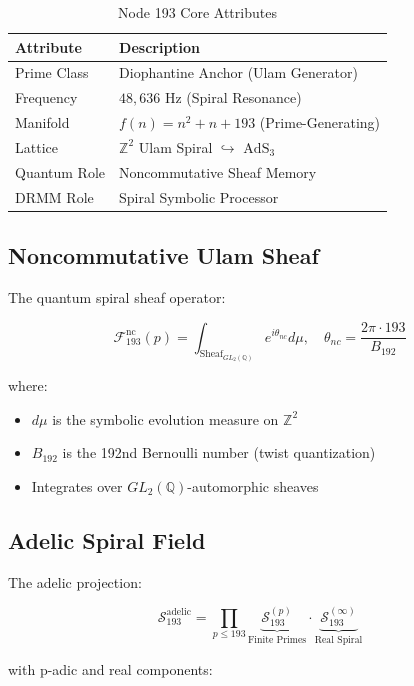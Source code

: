 \documentclass[12pt]{article}
\begin{document}
\begin{center}
\begin{table}[h]
\centering
\caption{Node 193 Core Attributes}
\begin{tabular}{ll}
\hline
\textbf{Attribute} & \textbf{Description} \\
\hline
Prime Class & Diophantine Anchor (Ulam Generator) \\
Frequency & $48,\!636$ Hz (Spiral Resonance) \\
Manifold & $f(n) = n^2 + n + 193$ (Prime-Generating) \\
Lattice & $\mathbb{Z}^2$ Ulam Spiral $\hookrightarrow$ $\text{AdS}_3$ \\
Quantum Role & Noncommutative Sheaf Memory \\
DRMM Role & Spiral Symbolic Processor \\
\hline
\end{tabular}
\end{table}

\subsection{Noncommutative Ulam Sheaf}
\label{subsec:sheaf}

The quantum spiral sheaf operator:

\[
\mathcal{F}_{193}^{\text{nc}}(p) = \int_{\text{Sheaf}_{GL_2(\mathbb{Q})}} e^{i\theta_{nc}} d\mu, \quad \theta_{nc} = \frac{2\pi \cdot 193}{B_{192}}
\]

where:
\begin{itemize}
    \item $d\mu$ is the symbolic evolution measure on $\mathbb{Z}^2$
    \item $B_{192}$ is the 192nd Bernoulli number (twist quantization)
    \item Integrates over $GL_2(\mathbb{Q})$-automorphic sheaves
\end{itemize}

\subsection{Adelic Spiral Field}
\label{subsec:adelic}

The adelic projection:

\[
\mathcal{S}_{193}^{\text{adelic}} = \prod_{p \leq 193} \underbrace{\mathcal{S}_{193}^{(p)}}_{\text{Finite Primes}} \cdot \underbrace{\mathcal{S}_{193}^{(\infty)}}_{\text{Real Spiral}}
\]

with p-adic and real components:


\end{center}
\end{document}
